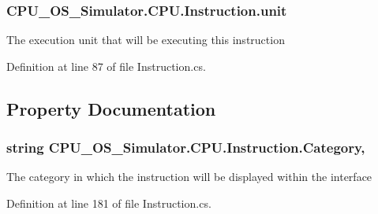 \subsubsection[{unit}]{ C\+P\+U\+\_\+\+O\+S\+\_\+\+Simulator.\+C\+P\+U.\+Instruction.\+unit\hspace{0.3cm}{\ttfamily [private]}}\label{class_c_p_u___o_s___simulator_1_1_c_p_u_1_1_instruction_a0337c93fbfb5993eab37f1d052ca5f43}


The execution unit that will be executing this instruction 



Definition at line 87 of file Instruction.\+cs.



\subsection{Property Documentation}
\hypertarget{class_c_p_u___o_s___simulator_1_1_c_p_u_1_1_instruction_a7b7c3068cebbf81c64b67496b20c733a}{}
\subsubsection[{Category}]{\setlength{\rightskip}{0pt plus 5cm}string C\+P\+U\+\_\+\+O\+S\+\_\+\+Simulator.\+C\+P\+U.\+Instruction.\+Category\hspace{0.3cm}{\ttfamily [get]}, {\ttfamily [set]}}\label{class_c_p_u___o_s___simulator_1_1_c_p_u_1_1_instruction_a7b7c3068cebbf81c64b67496b20c733a}


The category in which the instruction will be displayed within the interface 



Definition at line 181 of file Instruction.\+cs.

\hypertarget{class_c_p_u___o_s___simulator_1_1_c_p_u_1_1_instruction_afc4c52737c07181195a29413cf09d2a5}{}
